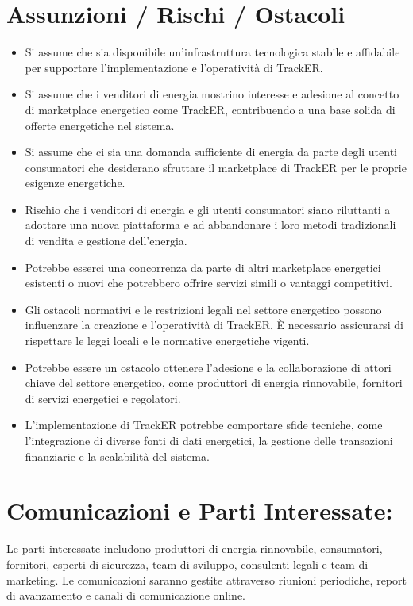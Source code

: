 \documentclass{report}
\begin{document}
\section*{Assunzioni / Rischi / Ostacoli}
\begin{itemize}
    \item Si assume che sia disponibile un'infrastruttura tecnologica stabile e affidabile per supportare l'implementazione e l'operatività di TrackER.
    \item Si assume che i venditori di energia mostrino interesse e adesione al concetto di marketplace energetico come TrackER, contribuendo a una base solida di offerte energetiche nel sistema.
    \item Si assume che ci sia una domanda sufficiente di energia da parte degli utenti consumatori che desiderano sfruttare il marketplace di TrackER per le proprie esigenze energetiche.
    \item Rischio che i venditori di energia e gli utenti consumatori siano riluttanti a adottare una nuova piattaforma e ad abbandonare i loro metodi tradizionali di vendita e gestione dell'energia.
    \item Potrebbe esserci una concorrenza da parte di altri marketplace energetici esistenti o nuovi che potrebbero offrire servizi simili o vantaggi competitivi.
    \item Gli ostacoli normativi e le restrizioni legali nel settore energetico possono influenzare la creazione e l'operatività di TrackER. È necessario assicurarsi di rispettare le leggi locali e le normative energetiche vigenti.
    \item Potrebbe essere un ostacolo ottenere l'adesione e la collaborazione di attori chiave del settore energetico, come produttori di energia rinnovabile, fornitori di servizi energetici e regolatori.
    \item L'implementazione di TrackER potrebbe comportare sfide tecniche, come l'integrazione di diverse fonti di dati energetici, la gestione delle transazioni finanziarie e la scalabilità del sistema.
\end{itemize}



\section*{Comunicazioni e Parti Interessate:}
Le parti interessate includono produttori di energia rinnovabile, consumatori, fornitori, esperti di sicurezza, team di sviluppo, consulenti legali e team di marketing. Le comunicazioni saranno gestite attraverso riunioni periodiche, report di avanzamento e canali di comunicazione online.
\end{document}
